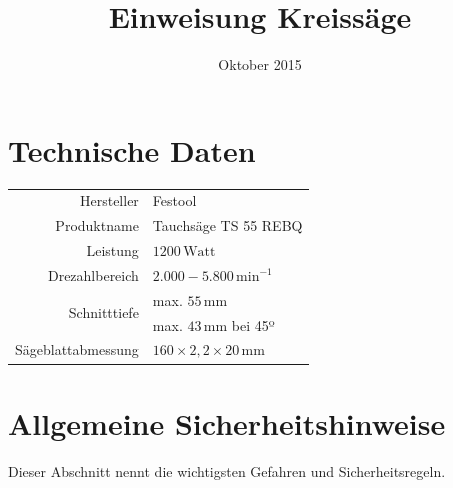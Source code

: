 \documentclass{\basedir/fablab-document}
\date{Oktober 2015}
\author{}
\title{Einweisung Kreissäge}
\begin{document}
\dosecttoc
\faketableofcontents
{}


\section{Technische Daten}
\begin{tabular}{r|l}
Hersteller & Festool \\
Produktname & Tauchsäge TS 55 REBQ \\
Leistung & $1200\,\mathrm{Watt}$ \\
Drezahlbereich & $2.000 - 5.800\,\mathrm{min}^{-1}$ \\
\multirow{2}{*}{Schnitttiefe} & max. $55\,\mathrm{mm}$ \\
             & max. $43\,\mathrm{mm}$ bei 45º\\
Sägeblattabmessung & $160\times 2,2\times 20\,\mathrm{mm}$\\
\end{tabular}

\section[Allgemeine Sicherheitshinweise]{Allgemeine Sicherheitshinweise}

Dieser Abschnitt nennt die wichtigsten Gefahren und Sicherheitsregeln.
\end{document}
